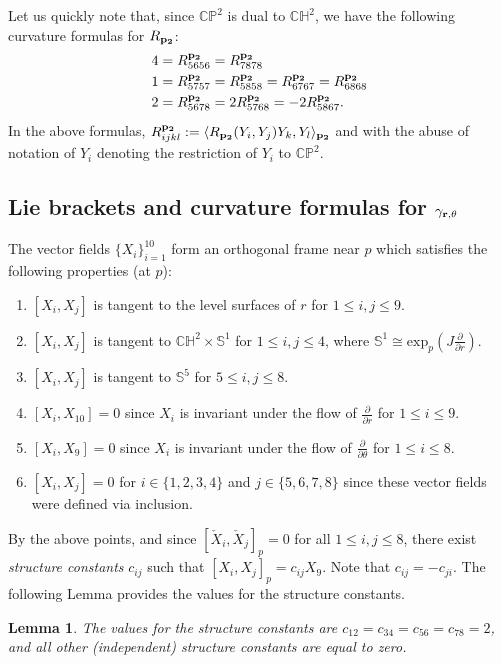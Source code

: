 \documentclass[10pt]{amsart}
\def\S{\mathcal{S}}
\def\g{\gamma}
\def\la{\langle}
\def\ra{\rangle}
\def\ddt{\frac{\partial}{\partial \theta}}
\def\ddr{\frac{\partial}{\partial r}}
\def\th{\theta}
\def\H{\mathbb{H}}
\def\C{\mathbb{C}}
\def\S{\mathbb{S}}
\def\P{\mathbb{P}}
\newtheorem{lemma}[theorem]{Lemma}
\theoremstyle{definition}
\theoremstyle{remark}
\numberwithin{equation}{section}
\begin{document}
Let us quickly note that, since $\C \P^2$ is dual to $\C \H^2$, we have the following curvature formulas for $R_{\bf p_2}$:
	\begin{align*}
	4 &= R^{\bf p_2}_{5656} = R^{\bf p_2}_{7878}  \\
	1 &= R^{\bf p_2}_{5757} = R^{\bf p_2}_{5858} = R^{\bf p_2}_{6767} = R^{\bf p_2}_{6868}  \\
	2 &= R^{\bf p_2}_{5678} = 2 R^{\bf p_2}_{5768} = -2 R^{\bf p_2}_{5867}.
	\end{align*}
In the above formulas, $R^{\bf p_2}_{ijkl} := \la R_{\bf p_2}(Y_i,Y_j)Y_k,Y_l \ra_{\bf p_2}$ and with the abuse of notation of $Y_i$ denoting the restriction of $Y_i$ to $\C \P^2$.  
	
	
\subsection{Lie brackets and curvature formulas for ${\bf \g_{r, \th}}$}
The vector fields $\{ X_i \}_{i=1}^{10}$ form an orthogonal frame near $p$ which satisfies the following properties (at $p$):
	\begin{enumerate}
	\item $[X_i,X_j]$ is tangent to the level surfaces of $r$ for $1 \leq i, j \leq 9$.
	\item $[X_i,X_j]$ is tangent to $\C \H^2 \times \S^1$ for $1 \leq i, j \leq 4$, where $\S^1 \cong \text{exp}_p(J \ddr)$.
	\item $[X_i,X_j]$ is tangent to $\S^5$ for $5 \leq i, j \leq 8$.
	\item $[X_i,X_{10}] = 0$ since $X_i$ is invariant under the flow of $\ddr$ for $1 \leq i \leq 9$.
	\item $[X_i,X_9] = 0$ since $X_i$ is invariant under the flow of $\ddt$ for $1 \leq i \leq 8$.
	\item $[X_i, X_j] = 0$ for $i \in \{ 1, 2, 3, 4 \}$ and $j \in \{5, 6, 7, 8 \}$ since these vector fields were defined via inclusion.
	\end{enumerate}
By the above points, and since $[\check{X}_i,\check{X}_j]_p = 0$ for all $1 \leq i, j \leq 8$, there exist {\em structure constants} $c_{ij}$ such that $[X_i,X_j]_p = c_{ij} X_9$.
Note that $c_{ij} = - c_{ji}$.  
The following Lemma provides the values for the structure constants.

\vskip 15pt

\begin{lemma}\label{lemma:structure constants}
The values for the structure constants are $c_{12} = c_{34} = c_{56} = c_{78} = 2$, and all other (independent) structure constants are equal to zero.
\end{lemma}
\end{document}
